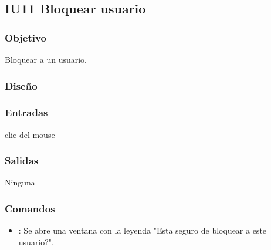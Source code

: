 \newpage
\subsection{IU11 Bloquear usuario}

\subsubsection{Objetivo}
	Bloquear a un usuario.
	
\subsubsection{Diseño}
	 	


\subsubsection{Entradas}

	clic del mouse 
	

\subsubsection{Salidas}

	Ninguna

\subsubsection{Comandos}
\begin{itemize}
	\item {}: Se abre una ventana con la leyenda "Esta seguro de bloquear a este usuario?".
\end{itemize}
